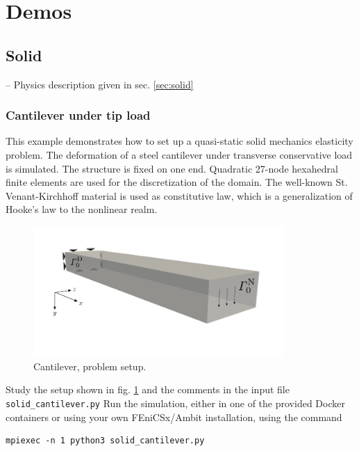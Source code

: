 \documentclass[a4paper,12pt]{report}
\begin{document}
\section{Demos}\label{sec:demos}

\subsection{Solid}\label{subsec:demos:solid}

-- Physics description given in sec. \ref{sec:solid}

\subsubsection*{Cantilever under tip load}

This example demonstrates how to set up a quasi-static solid mechanics elasticity problem. The deformation of a steel cantilever under transverse conservative load is simulated. The structure is fixed on one end. Quadratic 27-node hexahedral finite elements are used for the discretization of the domain. The well-known St. Venant-Kirchhoff material is used as constitutive law, which is a generalization of Hooke's law to the nonlinear realm.\\

\begin{figure}
\centering
\includegraphics[width=0.85\textwidth]{fig/cantilever_setup.png}
\caption{Cantilever, problem setup.}
\label{fig:cantilever_setup}
\end{figure}

Study the setup shown in fig. \ref{fig:cantilever_setup} and the comments in the input file \verb"solid_cantilever.py" Run the simulation, either in one of the provided Docker containers or using your own FEniCSx/Ambit installation, using the command

\begin{verbatim}
mpiexec -n 1 python3 solid_cantilever.py
\end{verbatim}
\end{document}

